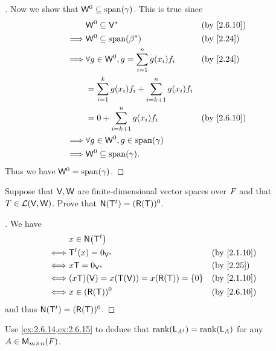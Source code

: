 \begin{proof}[]
	Now we show that \(\W^0 \subseteq \spn{\gamma}\).
	This is true since
	\begin{align*}
		         & \W^0 \subseteq \V^*                                         &  & \by{2.6.10} \\
		\implies & \W^0 \subseteq \spn{\beta^*}                                &  & \by{2.24}   \\
		\implies & \forall g \in \W^0, g = \sum_{i = 1}^n g(x_i) f_i           &  & \by{2.24}   \\
		         & = \sum_{i = 1}^k g(x_i) f_i + \sum_{i = k + 1}^n g(x_i) f_i                  \\
		         & = 0 + \sum_{i = k + 1}^n g(x_i) f_i                         &  & \by{2.6.10} \\
		\implies & \forall g \in \W^0, g \in \spn{\gamma}                                       \\
		\implies & \W^0 \subseteq \spn{\gamma}.
	\end{align*}
	Thus we have \(\W^0 = \spn{\gamma}\).
\end{proof}

\begin{ex}\label{ex:2.6.15}
	Suppose that \(\mathsf{V}, \mathsf{W}\) are finite-dimensional vector spaces over \(\mathit{F}\) and that \(T \in \mathcal{L}(\mathsf{V}, \mathsf{W})\).
	Prove that \(\ns{\tp{\T}} = (\rg{\T})^0\).
\end{ex}

\begin{proof}[]
	We have
	\begin{align*}
		     & x \in \ns{\tp{\T}}                                             \\
		\iff & \tp{\T}(x) = 0_{\V^*}                         &  & \by{2.1.10} \\
		\iff & x \T = 0_{\V^*}                               &  & \by{2.25}   \\
		\iff & (x \T)(\V) = x(\T(\V)) = x(\rg{\T}) = \set{0} &  & \by{2.1.10} \\
		\iff & x \in (\rg{\T})^0                             &  & \by{2.6.10}
	\end{align*}
	and thus \(\ns{\tp{\T}} = (\rg{\T})^0\).
\end{proof}

\begin{ex}\label{ex:2.6.16}
	Use \cref{ex:2.6.14,ex:2.6.15} to deduce that \(\rk{\L_{\tp{A}}} = \rk{\L_A}\) for any \(A \in \ms\).
\end{ex}

